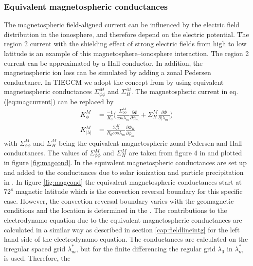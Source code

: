 \subsubsection{Equivalent magnetospheric conductances}\label{cap:magncond}
%
The magnetospheric field-aligned current can be influenced by the electric field
distribution in the ionosphere, and therefore depend on the electric potential. The
region 2 current with the shielding effect of strong electric fields from high to low
latitude is an example of this magnetosphere--ionosphere interaction. The region 2
current can be approximated by a Hall conductor. In addition, the 
magnetospheric ion loss
can be simulated by adding a zonal Pedersen conductance. 
In TIEGCM we adopt the concept from
\cite{peym93} by using equivalent magnetospheric conductances 
$\Sigma_{\phi \phi}^M$ and $\Sigma_{H}^M$. 
The magnetospheric current in eq. (\ref{eq:magcurrent}) can
be replaced by
%
\begin{align}
  K_{\phi}^M       &=  \frac{-1}{R_0} \bigl( \frac{\Sigma_{\phi \phi}^M}{cos
   \lambda_m} \frac{\partial \Phi}{\partial \phi_m} + 
   \Sigma_{H}^M \frac{\partial \Phi}{\partial |\lambda_m|} \bigr)  \label{eq:mageqcur_phi}\\
  K_{|\lambda|}^M  &=   \frac{\Sigma_{H}^M}{R_0 cos \lambda_m}
    \frac{ \partial \Phi_R}{\partial \phi_m} \label{eq:mageqcur_lam}
\end{align}
%
with $\Sigma_{\phi \phi}^M$ and $\Sigma_{H}^M$ being the equivalent magnetospheric zonal
Pedersen and Hall conductances. The values of $\Sigma_{\phi \phi}^M$ and $\Sigma_{H}^M$
are taken from figure 4 in \cite{peym93} and plotted in figure \ref{fig:magcond}. In 
 the equivalent magnetospheric conductances 
are set up and added to the conductances due to solar ionization and
particle precipitation in . In figure 
\ref{fig:magcond} the equivalent magnetospheric
conductances start at $72^o$ magnetic latitude which is the 
convection reversal boundary for this specific
case. However, the convection reversal boundary varies with the geomagnetic conditions
and the location is determined in the . 
The contributions to the electrodynamo equation 
due to the equivalent magnetospheric conductances 
 are calculated in a similar way as
described in section \ref{cap:fieldlineintg} for the left hand side of the electrodynamo
equation. The conductances are calculated on the irregular spaced grid $\lambda_m^*$, 
but for the finite differencing the regular grid $\lambda_0$ in
 $\lambda_m^*$ is used. Therefore, the
